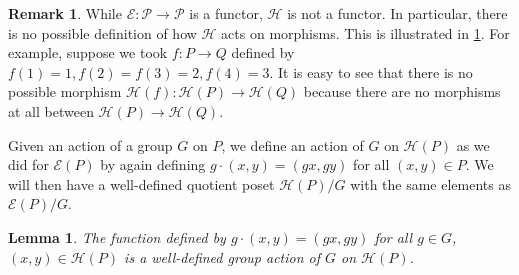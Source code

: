 \documentclass[10 pt]{amsart}
\theoremstyle{plain}
\newtheorem{lem}[thm]{Lemma}
\theoremstyle{definition}
\newtheorem{rem}[thm]{Remark}
\theoremstyle{remark}
\numberwithin{equation}{section}
\begin{document}
\begin{rem}
While $\mathcal E:\mathcal P \rightarrow \mathcal P$ is a functor, $\mathcal H$ is not a functor. In particular, there is no possible definition of how $\mathcal H$ acts on morphisms. This is illustrated in \ref{fig:h_morphism}. For example, suppose we took $f:P \rightarrow Q$ defined by $f(1) = 1, f(2) = f(3) = 2,f(4) = 3.$ 
It is easy to see that there is no possible morphism $\mathcal H(f):\mathcal H(P)\rightarrow \mathcal H(Q)$ because there are no morphisms at all between $\mathcal H(P) \rightarrow \mathcal H(Q).$

\begin{figure}[h!]
\begin{center}
\quad
{}\quad
{} \quad
{}
\end{center}
\label{fig:h_morphism}
\caption{}
\end{figure}
\end{rem}



Given an action of a group $G$ on $P$, we define an action of $G$ on $\mathcal{H}(P)$ as we did for $\mathcal{E}(P)$ by again defining $g\cdot (x,y) = (gx,gy)$ for all $(x,y)\in P$.  We will then have a well-defined quotient poset $\mathcal{H}(P)/G$ with the same elements as $\mathcal{E}(P)/G$.


\begin{lem}
\label{lem:G_action_on_HP}
The function defined by $g\cdot (x, y)= (gx, gy)$ for all $g\in G$, $(x, y)\in \mathcal{H}(P)$ is a well-defined group action of $G$ on $\mathcal{H}(P)$.
\end{lem}
\end{document}

